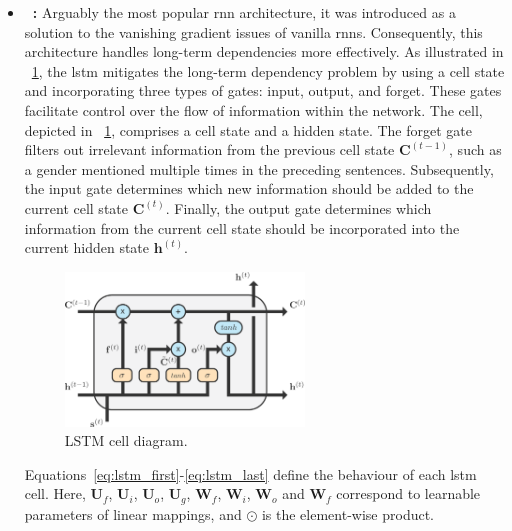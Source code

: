 \begin{itemize}
    
    \item \textbf{~\cite{hochreiter1997long}:} Arguably the most popular \gls{rnn} architecture, it was introduced as a solution to the vanishing gradient issues of vanilla \glspl{rnn}. Consequently, this architecture handles long-term dependencies more effectively. As illustrated in \fig~\ref{fig:lstm}, the \gls{lstm} mitigates the long-term dependency problem by using a cell state and incorporating three types of gates: input, output, and forget. These gates facilitate control over the flow of information within the network. The cell, depicted in \fig~\ref{fig:lstm}, comprises a cell state and a hidden state. The forget gate filters out irrelevant information from the previous cell state $\mathbf{C}^{(t-1)}$, such as a gender mentioned multiple times in the preceding sentences. Subsequently, the input gate determines which new information should be added to the current cell state $\mathbf{C}^{(t)}$. Finally, the output gate determines which information from the current cell state should be incorporated into the current hidden state $\mathbf{h}^{(t)}$.
    \begin{figure}[!ht]
    \begin{center}
    \includegraphics[width=0.60\textwidth]{Figures/Background/lstm.pdf}
    \caption{LSTM cell diagram.}
    \label{fig:lstm}
    \end{center}
    \end{figure}

    Equations~\eqref{eq:lstm_first}-\eqref{eq:lstm_last} define the behaviour of each \gls{lstm} cell. Here, $\bm{U}_f$, $\bm{U}_i$, $\bm{U}_o$, $\bm{U}_g$, $\bm{W}_f$, $\bm{W}_i$, $\bm{W}_o$ and $\bm{W}_f$ correspond to learnable parameters of linear mappings, and $\odot$ is the element-wise product.


\end{itemize}
